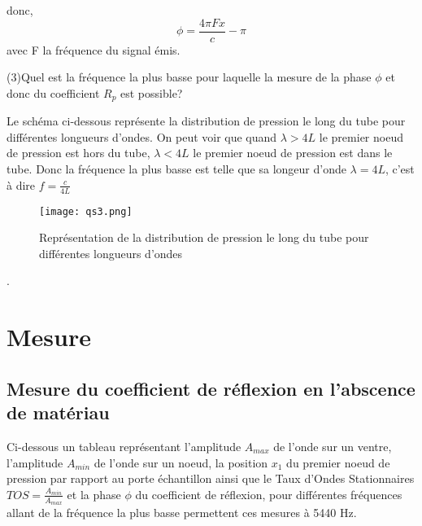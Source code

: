 \documentclass[a4paper,11pt]{article}
\begin{document}
donc,
$$\boxed{\phi = \frac{4 \pi Fx}{c} - \pi}$$ avec F la fréquence du signal émis.
\newline
\newline
\newline
\newline
\newline
\newline
\newline
\newline

(3)Quel est la fréquence la plus basse pour laquelle la mesure de la phase $\phi$ et donc du coefficient $R_{p}$ est possible?

Le schéma ci-dessous représente la distribution de pression le long du tube pour différentes longueurs d'ondes. On peut voir que quand $\lambda > 4L$ le premier noeud de pression est hors du tube, $\lambda < 4L$ le premier noeud de pression est dans le tube. Donc la fréquence la plus basse est telle que sa longeur d'onde $\lambda = 4L$, c'est à dire $f = \frac{c}{4L}$


\begin{figure}[h]
\centering
\texttt{[image: qs3.png]}
\caption{Représentation de la distribution de pression le long du tube pour différentes longueurs d'ondes}
\end{figure}
.
\newpage

\section{Mesure}

\subsection{Mesure du coefficient de réflexion en l'abscence de matériau}
Ci-dessous un tableau représentant l'amplitude $A_{max}$ de l'onde sur un ventre, l'amplitude $A_{min}$ de l'onde sur un noeud, la position $x_{1}$ du premier noeud de pression par rapport au porte échantillon ainsi que le Taux d'Ondes Stationnaires $TOS = \frac{A_{min}}{A_{max}}$ et la phase $\phi$ du coefficient de réflexion, pour différentes fréquences allant de la fréquence la plus basse permettent ces mesures à 5440 Hz.
\end{document}

